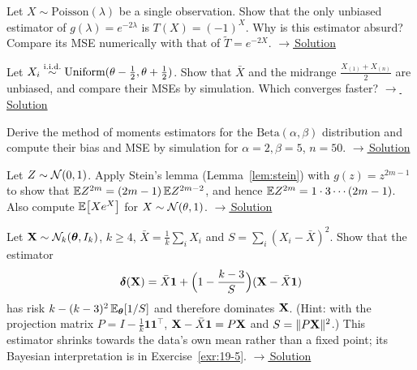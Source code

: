 \documentclass[main.tex]{subfiles}
\begin{document}
\begin{exercise}\label{exr:07-2}\label{exr:sacma-yansiz}
Let $X\sim\text{Poisson}(\lambda)$ be a single observation. Show that the only unbiased estimator of $g(\lambda)=e^{-2\lambda}$ is $T(X)=(-1)^X$. Why is this estimator absurd? Compare its MSE numerically with that of $\tilde T=e^{-2X}$.
\hfill\hyperref[coz:07-2]{\footnotesize$\rightarrow$\,Solution}
\end{exercise}

\begin{exercise}\label{exr:07-3}
Let $X_i\overset{\text{i.i.d.}}{\sim}\text{Uniform}(\theta-\tfrac12,\theta+\tfrac12)$. Show that $\bar X$ and the midrange $\frac{X_{(1)}+X_{(n)}}{2}$ are unbiased, and compare their MSEs by simulation. Which converges faster?
\hfill\hyperref[coz:07-3]{\footnotesize$\rightarrow$\,Solution}
\end{exercise}

\begin{exercise}\label{exr:07-4}
Derive the method of moments estimators for the $\text{Beta}(\alpha,\beta)$ distribution and compute their bias and MSE by simulation for $\alpha=2,\beta=5$, $n=50$.
\hfill\hyperref[coz:07-4]{\footnotesize$\rightarrow$\,Solution}
\end{exercise}

\begin{exercise}\label{exr:07-5}
Let $Z\sim\mathcal{N}(0,1)$. Apply Stein's lemma (Lemma~\ref{lem:stein}) with $g(z)=z^{2m-1}$ to show that $\mathbb{E} Z^{2m}=(2m-1)\,\mathbb{E} Z^{2m-2}$, and hence $\mathbb{E} Z^{2m}=1\cdot3\cdots(2m-1)$. Also compute $\mathbb{E}\big[Xe^X\big]$ for $X\sim\mathcal{N}(\theta,1)$.
\hfill\hyperref[coz:07-5]{\footnotesize$\rightarrow$\,Solution}
\end{exercise}

\begin{exercise}\label{exr:07-6}
Let $\mathbf{X}\sim\mathcal{N}_k(\bm\theta,I_k)$, $k\ge4$, $\bar X=\frac1k\sum_iX_i$ and $S=\sum_i(X_i-\bar X)^2$. Show that the estimator
\[
\bm\delta(\mathbf{X})=\bar X\mathbf 1+\Big(1-\frac{k-3}{S}\Big)(\mathbf{X}-\bar X\mathbf 1)
\]
has risk $k-(k-3)^2\,\mathbb{E}_{\bm\theta}[1/S]$ and therefore dominates $\mathbf{X}$. (Hint: with the projection matrix $P=I-\frac1k\mathbf 1\mathbf 1^\top$, $\mathbf{X}-\bar X\mathbf 1=P\mathbf{X}$ and $S=\|P\mathbf{X}\|^2$.) This estimator shrinks towards the data's own mean rather than a fixed point; its Bayesian interpretation is in Exercise~\ref{exr:19-5}.
\hfill\hyperref[coz:07-6]{\footnotesize$\rightarrow$\,Solution}
\end{exercise}

\end{document}
